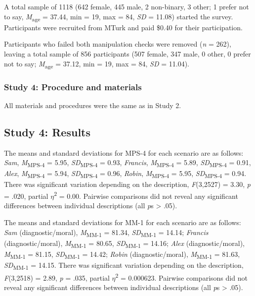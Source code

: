 \documentclass[
  english,
  man,floatsintext]{apa7}
\begin{document}
A total sample of 1118 (642 female, 445 male, 2 non-binary, 3 other; 1 prefer not to say, \emph{M}\textsubscript{age} = 37.44, min = 19, max = 84, \emph{SD} = 11.08) started the survey. Participants were recruited from MTurk and paid \$0.40 for their participation.

Participants who failed both manipulation checks were removed (\emph{n} = 262), leaving a total sample of 856 participants (507 female, 347 male, 0 other, 0 prefer not to say; \emph{M}\textsubscript{age} = 37.12, min = 19, max = 84, \emph{SD} = 11.04).

\hypertarget{study-4-procedure-and-materials}{%
\subsubsection{Study 4: Procedure and materials}\label{study-4-procedure-and-materials}}

All materials and procedures were the same as in Study 2.

\hypertarget{study-4-results}{%
\subsection{Study 4: Results}\label{study-4-results}}

The means and standard deviations for MPS-4 for each scenario are as follows:
\emph{Sam},
\emph{M}\textsubscript{MPS-4} = 5.95, \emph{SD}\textsubscript{MPS-4} = 0.93,
\emph{Francis},
\emph{M}\textsubscript{MPS-4} = 5.89, \emph{SD}\textsubscript{MPS-4} = 0.91,
\emph{Alex},
\emph{M}\textsubscript{MPS-4} = 5.94, \emph{SD}\textsubscript{MPS-4} = 0.96,
\emph{Robin},
\emph{M}\textsubscript{MPS-4} = 5.95, \emph{SD}\textsubscript{MPS-4} = 0.94. There was significant variation depending on the description, \emph{F}(3,2527) = 3.30, \emph{p} = .020, partial \(\eta\)\textsuperscript{2} = 0.00. Pairwise comparisons did not reveal any significant differences between individual descriptions (all \emph{p}s \textgreater{} .05).

The means and standard deviations for MM-1 for each scenario are as follows:
\emph{Sam} (diagnostic/moral),
\emph{M}\textsubscript{MM-1} = 81.34, \emph{SD}\textsubscript{MM-1} = 14.14;
\emph{Francis} (diagnostic/moral),
\emph{M}\textsubscript{MM-1} = 80.65, \emph{SD}\textsubscript{MM-1} = 14.16;
\emph{Alex} (diagnostic/moral),
\emph{M}\textsubscript{MM-1} = 81.15, \emph{SD}\textsubscript{MM-1} = 14.42;
\emph{Robin} (diagnostic/moral),
\emph{M}\textsubscript{MM-1} = 81.63, \emph{SD}\textsubscript{MM-1} = 14.15. There was significant variation depending on the description, \emph{F}(3,2518) = 2.89, \emph{p} = .035, partial \(\eta\)\textsuperscript{2} = 0.000623. Pairwise comparisons did not reveal any significant differences between individual descriptions (all \emph{p}s \textgreater{} .05).
\end{document}
